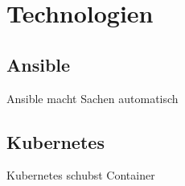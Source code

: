 \chapter{Technologien}
\section{Ansible}
Ansible macht Sachen automatisch
\section{Kubernetes}
Kubernetes schubst Container